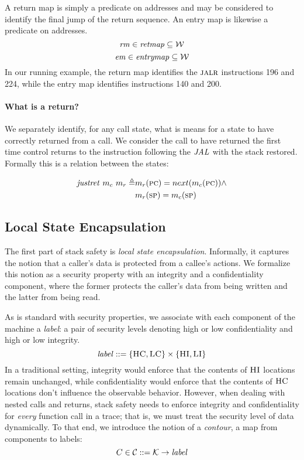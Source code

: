 \documentclass[acmsmall,review,anonymous]{acmart}\settopmatter{printfolios=true,printccs=false,printacmref=false}
\begin{document}
A return map is simply a predicate on addresses and may be considered
to identify the final jump of the return sequence. An entry map is
likewise a predicate on addresses.
\[\mathit{rm} \in \mathit{retmap} \subseteq {\mathcal W}\]
\[\mathit{em} \in \mathit{entrymap} \subseteq {\mathcal W}\]
%
In our running example, the return map identifies the $\textsc{jalr}$
instructions 196 and 224, while the entry map identifies
instructions 140 and 200.

\paragraph*{What is a return?}

We separately identify, for any call state, what is means for a state
to have correctly returned from a call. We consider the call to have
returned the first time control returns to the instruction following
the \(\mathit{JAL}\) with the stack restored. Formally this is a relation
between the states:

\[\begin{split}
    \mathit{justret}\ m_c\ m_r \triangleq & m_r(\textsc{pc}) =
    next(m_c(\textsc{pc})) \land \\ & m_r(\textsc{sp}) = m_c(\textsc{sp})
\end{split}\]


\subsection{Local State Encapsulation}
\label{sec:lse}

The first part of stack safety is {\em local state encapsulation}.
Informally, it captures the notion that a caller's data is
protected from a callee's actions. We formalize this notion
as a security property with an integrity and a confidentiality
component, where the former protects the caller's data from being
written and the latter from being read.

As is standard with security properties, we associate with each
component of the machine a {\em label}: a pair of security levels
denoting high or low confidentiality and high or low integrity.
%
\[\mathit{label} ::= \{\textsc{HC},\textsc{LC}\} \times \{\textsc{HI},\textsc{LI}\}\]
%
In a traditional setting, integrity would enforce that the contents of
$\textsc{HI}$ locations remain unchanged, while confidentiality would
enforce that the contents of $\textsc{HC}$ locations don't influence the
observable behavior. However, when dealing with nested calls and
returns, stack safety needs to enforce integrity and confidentiality
for {\em every} function call in a trace; that is, we must treat the
security level of data dynamically.
%
To that end, we introduce the notion of a {\em contour}, a map from
components to labels:
%
\[C \in {\mathcal C} ::= {\mathcal K} \rightarrow \mathit{label}\]
\end{document}
